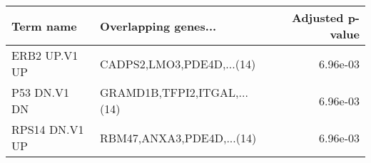 \begin{tabular}{llr}
\toprule
     Term name &        Overlapping genes... &  Adjusted p-value \\
\midrule
 ERB2 UP.V1 UP &   CADPS2,LMO3,PDE4D,...(14) &          6.96e-03 \\
  P53 DN.V1 DN & GRAMD1B,TFPI2,ITGAL,...(14) &          6.96e-03 \\
RPS14 DN.V1 UP &   RBM47,ANXA3,PDE4D,...(14) &          6.96e-03 \\
\bottomrule
\end{tabular}
